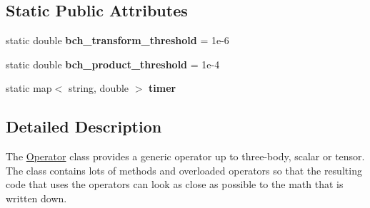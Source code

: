\subsection*{Static Public Attributes}
\begin{DoxyCompactItemize}
\item 
\hypertarget{classOperator_af4743d3c6e99ebf1915b348447c8e688}{static double {\bfseries bch\-\_\-transform\-\_\-threshold} = 1e-\/6}\label{classOperator_af4743d3c6e99ebf1915b348447c8e688}

\item 
\hypertarget{classOperator_ad4a2ba438f3286ef22cc06b61f745993}{static double {\bfseries bch\-\_\-product\-\_\-threshold} = 1e-\/4}\label{classOperator_ad4a2ba438f3286ef22cc06b61f745993}

\item 
\hypertarget{classOperator_ae3de2afa3ff3dca088122a79404da831}{static map$<$ string, double $>$ {\bfseries timer}}\label{classOperator_ae3de2afa3ff3dca088122a79404da831}

\end{DoxyCompactItemize}


\subsection{Detailed Description}
The \hyperlink{classOperator}{Operator} class provides a generic operator up to three-\/body, scalar or tensor. The class contains lots of methods and overloaded operators so that the resulting code that uses the operators can look as close as possible to the math that is written down. 

